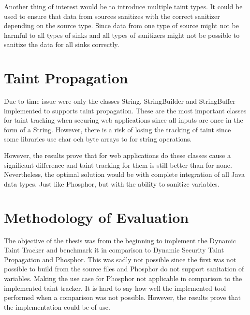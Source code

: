 Another thing of interest would be to introduce multiple taint types. It could be used to ensure that data from sources sanitizes with the correct sanitizer depending on the source type. Since data from one type of source might not be harmful to all types of sinks and all types of sanitizers might not be possible to sanitize the data for all sinks correctly.



\section{Taint Propagation}
\label{propagation}
Due to time issue were only the classes String, StringBuilder and StringBuffer implemented to supports taint propagation. These are the most important classes for taint tracking when securing web applications since all inputs are once in the form of a String. However, there is a risk of losing the tracking of taint since some libraries use char och byte arrays to for string operations.

However, the results prove that for web applications do these classes cause a significant difference and taint tracking for them is still better than for none. Nevertheless, the optimal solution would be with complete integration of all Java data types. Just like Phosphor, but with the ability to sanitize variables.



\section{Methodology of Evaluation}
\label{methev}
The objective of the thesis was from the beginning to implement the Dynamic Taint Tracker and benchmark it in comparison to Dynamic Security Taint Propagation and Phosphor. This was sadly not possible since the first was not possible to build from the source files and Phosphor do not support sanitation of variables. Making the use case for Phosphor not applicable in comparison to the implemented taint tracker. It is hard to say how well the implemented tool performed when a comparison was not possible. However, the results prove that the implementation could be of use.